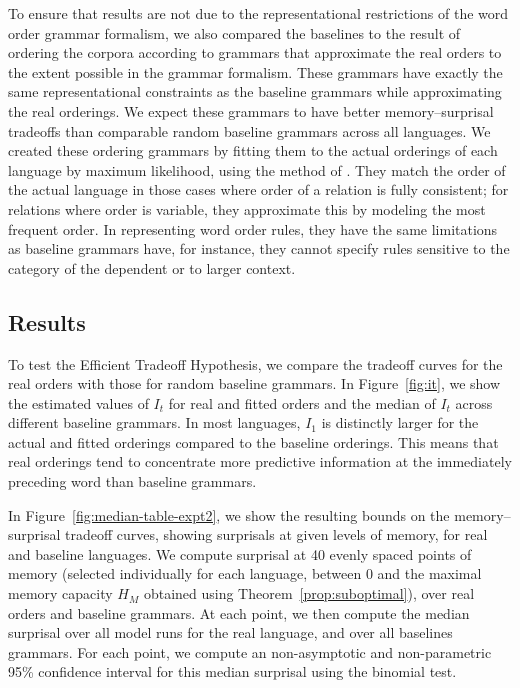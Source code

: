 To ensure that results are not due to the representational restrictions of the word order grammar formalism, we also compared the baselines to the result of ordering the corpora according to grammars that approximate the real orders to the extent possible in the grammar formalism.
These grammars have exactly the same representational constraints as the baseline grammars while approximating the real orderings.
We expect these grammars to have better memory--surprisal tradeoffs than comparable random baseline grammars across all languages.
We created these ordering grammars by fitting them to the actual orderings of each language by maximum likelihood, using the method of \cite{hahn2020universals}.
They match the order of the actual language in those cases where order of a relation is fully consistent; for relations where order is variable, they approximate this by modeling the most frequent order.
In representing word order rules, they have the same limitations as baseline grammars have, for instance, they cannot specify rules sensitive to the category of the dependent or to larger context.


\subsection{Results}\label{sec:main-experiment-results}
To test the Efficient Tradeoff Hypothesis, we compare the tradeoff curves for the real orders with those for random baseline grammars.
In Figure~\ref{fig:it}, we show the estimated values of $I_t$ for real and fitted orders and the median of $I_t$ across different baseline grammars.
In most languages, $I_1$ is distinctly larger for the actual and fitted orderings compared to the baseline orderings. This means that real orderings tend to concentrate more predictive information at the immediately preceding word than baseline grammars.

In Figure~\ref{fig:median-table-expt2}, we show the resulting bounds on the memory--surprisal tradeoff curves, showing surprisals at given levels of memory, for real and baseline languages.
We compute surprisal at 40 evenly spaced points of memory (selected individually for each language, between 0 and the maximal memory capacity $H_M$ obtained using Theorem~\ref{prop:suboptimal}), over real orders and baseline grammars.
At each point, we then compute the median surprisal over all model runs for the real language, and over all baselines grammars.
For each point, we compute an non-asymptotic and non-parametric 95\% confidence interval for this median surprisal using the binomial test.

